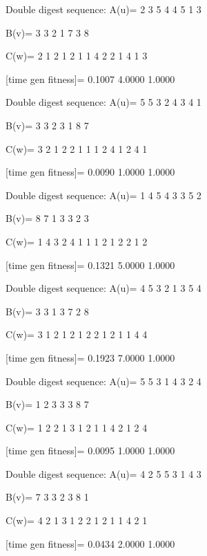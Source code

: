 Double digest sequence:
A(u)=
     2     3     5     4     4     5     1     3

B(v)=
     3     3     2     1     7     3     8

C(w)=
     2     1     2     1     2     1     1     4     2     2     1     4     1     3

[time gen fitness]=
    0.1007    4.0000    1.0000

Double digest sequence:
A(u)=
     5     5     3     2     4     3     4     1

B(v)=
     3     3     2     3     1     8     7

C(w)=
     3     2     1     2     2     1     1     1     2     4     1     2     4     1

[time gen fitness]=
    0.0090    1.0000    1.0000

Double digest sequence:
A(u)=
     1     4     5     4     3     3     5     2

B(v)=
     8     7     1     3     3     2     3

C(w)=
     1     4     3     2     4     1     1     1     2     1     2     2     1     2

[time gen fitness]=
    0.1321    5.0000    1.0000

Double digest sequence:
A(u)=
     4     5     3     2     1     3     5     4

B(v)=
     3     3     1     3     7     2     8

C(w)=
     3     1     2     1     2     1     2     2     1     2     1     1     4     4

[time gen fitness]=
    0.1923    7.0000    1.0000

Double digest sequence:
A(u)=
     5     5     3     1     4     3     2     4

B(v)=
     1     2     3     3     3     8     7

C(w)=
     1     2     2     1     3     1     2     1     1     4     2     1     2     4

[time gen fitness]=
    0.0095    1.0000    1.0000

Double digest sequence:
A(u)=
     4     2     5     5     3     1     4     3

B(v)=
     7     3     3     2     3     8     1

C(w)=
     4     2     1     3     1     2     2     1     2     1     1     4     2     1

[time gen fitness]=
    0.0434    2.0000    1.0000

